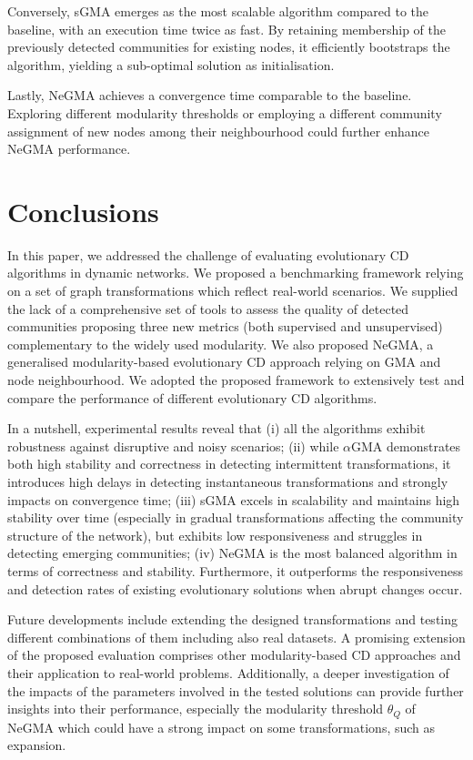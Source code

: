 \documentclass[letterpaper]{article}
\begin{document}
Conversely, sGMA emerges as the most scalable algorithm compared to the baseline, with an execution time twice as fast. By retaining membership of the previously detected communities for existing nodes, it efficiently bootstraps the algorithm, yielding a sub-optimal solution as initialisation. 

Lastly, NeGMA achieves a convergence time comparable to the baseline. 
Exploring different modularity thresholds or employing a different community assignment of new nodes among their neighbourhood could further enhance NeGMA performance.

\section{Conclusions}
\label{s:conclusions}

In this paper, we addressed the challenge of evaluating evolutionary CD algorithms in dynamic networks. We proposed a benchmarking framework relying on a set of graph transformations which reflect real-world scenarios. We supplied the lack of a comprehensive set of tools to assess the quality of detected communities proposing three new metrics (both supervised and unsupervised) complementary to the widely used modularity. We also proposed NeGMA, a generalised modularity-based evolutionary CD approach relying on GMA and node neighbourhood.
We adopted the proposed framework to extensively test and compare the performance of different evolutionary CD algorithms. 

In a nutshell, experimental results reveal that (i) all the algorithms exhibit robustness against disruptive and noisy scenarios; (ii) while $\alpha$GMA demonstrates both high stability and correctness in detecting intermittent transformations, it introduces high delays in detecting instantaneous transformations and strongly impacts on convergence time; (iii) sGMA excels in scalability and maintains high stability over time (especially in gradual transformations affecting the community structure of the network), but exhibits low responsiveness and struggles in detecting emerging communities; (iv) NeGMA is the most balanced algorithm in terms of correctness and stability. Furthermore, it outperforms the responsiveness and detection rates of existing evolutionary solutions when abrupt changes occur. 

Future developments include extending the designed transformations and testing different combinations of them including also real datasets. A promising extension of the proposed evaluation comprises other modularity-based CD approaches and their application to real-world problems. Additionally, a deeper investigation of the impacts of the parameters involved in the tested solutions can provide further insights into their performance, especially the modularity threshold $\theta_Q$ of NeGMA which could have a strong impact on some transformations, such as expansion.
\end{document}
